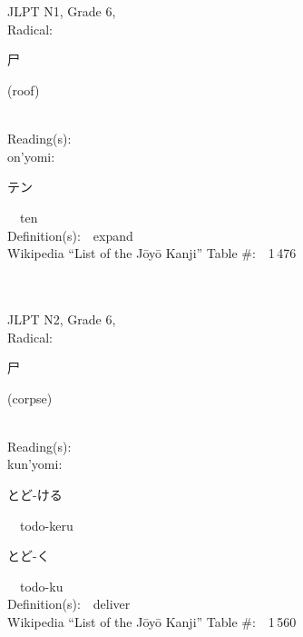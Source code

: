 \begin{multicols}{2}
\ \ \\
{\fontsize{34pt}{40pt}  }\ \ \\  %
{JLPT N1, Grade 6, \\Radical:\ \ {\begin{CJK}{UTF8}{min} 尸 \end{CJK}} (roof) } \\
Reading(s):\ \ \\
{\hspace*{1em}}on'yomi:\ \ \\
{\hspace*{2em}}{\begin{CJK}{UTF8}{min} テン \end{CJK}}\ \ ten\ \ \\
Definition(s):\ \ expand \\
Wikipedia ``List of the J\=oy\=o Kanji'' Table \#:\ \ 1\,476 \\
\ \ \\
{\fontsize{34pt}{40pt}  }\ \ \\  %
{JLPT N2, Grade 6, \\Radical:\ \ {\begin{CJK}{UTF8}{min} 尸 \end{CJK}} (corpse) } \\
Reading(s):\ \ \\
{\hspace*{1em}}kun'yomi:\ \ \\
{\hspace*{2em}}{\begin{CJK}{UTF8}{min} とど-ける \end{CJK}}\ \ todo-keru\ \ \\
{\hspace*{2em}}{\begin{CJK}{UTF8}{min} とど-く \end{CJK}}\ \ todo-ku\ \ \\
Definition(s):\ \ deliver \\
Wikipedia ``List of the J\=oy\=o Kanji'' Table \#:\ \ 1\,560 \\
\ \ \\
\end{multicols}


